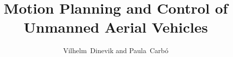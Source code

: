 \documentclass[journal, twoside]{IEEEtran}
\begin{document}
	\title{Motion Planning and Control of Unmanned Aerial Vehicles}
	\author{Vilhelm~Dinevik and Paula~Carb\'o}
		
	

	
	\maketitle
	
\end{document}
